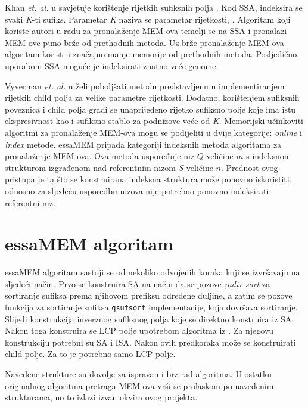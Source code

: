 \documentclass[times, utf8, seminar, numeric]{fer}
\begin{document}
Khan \textit{et. al.} u \cite{ssa} savjetuje korištenje rijetkih sufiksnih polja . Kod SSA, indeksira se svaki \textit{K}-ti sufiks. Parametar \textit{K} naziva se parametar rijetkosti, . Algoritam koji koriste autori u radu \cite{ssa} za pronalaženje MEM-ova temelji se na SSA i pronalazi MEM-ove puno brže od prethodnih metoda. Uz brže pronalaženje MEM-ova algoritam koristi i značajno manje memorije od prethodnih metoda. Posljedično, uporabom SSA moguće je indeksirati znatno veće genome.

Vyverman \textit{et. al.} u \cite{essa} želi poboljšati metodu predstavljenu u \cite{ssa} implementiranjem rijetkih child polja za velike parametre rijetkosti. Dodatno, korištenjem sufiksnih poveznica  i child polja gradi se unaprijeđeno rijetko sufiksno polje  koje ima istu ekspresivnost kao i sufiksno stablo za podnizove veće od \textit{K}. Memorijski učinkoviti algoritmi za pronalaženje MEM-ova mogu se podijeliti u dvije kategorije: \textit{online} i \textit{index} metode. essaMEM pripada kategoriji indeksnih metoda algoritama za pronalaženje MEM-ova. Ova metoda uspoređuje niz $Q$ veličine $m$ s indeksnom strukturom izgrađenom nad referentnim nizom $S$ veličine $n$. Prednost ovog pristupa je ta što se konstruirana indeksna struktura može ponovno iskoristiti, odnosno za sljedeću usporedbu nizova nije potrebno ponovno indeksirati referentni niz. 

\section{essaMEM algoritam}
\label{sec:essamem}

essaMEM algoritam sastoji se od nekoliko odvojenih koraka koji se izvršavaju na sljedeći način. Prvo se konstruira SA na način da se pozove \textit{radix sort} za sortiranje sufiksa prema njihovom prefiksu određene duljine, a zatim se pozove funkcija za sortiranje sufiksa \texttt{qsufsort} implementacije, koja dovršava sortiranje. Slijedi konstrukcija inverznog sufiksnog polja  koje se direktno konstruira iz SA. Nakon toga konstruira se LCP polje upotrebom algoritma iz \cite{lcp}. Za njegovu konstrukciju potrebni su SA i ISA. Nakon ovih predkoraka može se konstruirati child polje. Za to je potrebno samo LCP polje.

Navedene strukture su dovolje za ispravan i brz rad algoritma. U ostatku originalnog algoritma pretraga MEM-ova vrši se prolaskom po navedenim strukturama, no to izlazi izvan okvira ovog projekta.
\end{document}
